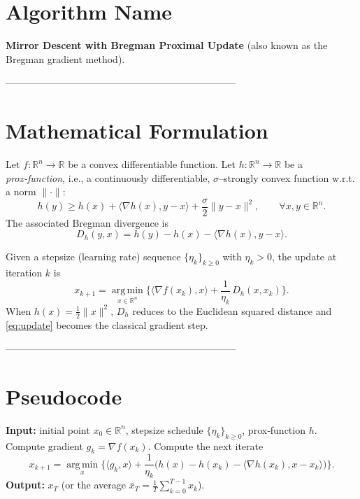 \documentclass{article}
\newcommand{\R}{\mathbb{R}}
\newcommand{\inner}[2]{\langle #1,#2\rangle}
\newcommand{\argmin}{\operatorname*{arg\,min}}
\newcommand{\D}[2]{D_{h}(#1,#2)}
\newcommand{\grad}{\nabla}
\begin{document}
\section*{Algorithm Name}
\textbf{Mirror Descent with Bregman Proximal Update} (also known as the Bregman gradient method).

-----------------------------------------------------------------------

\section*{Mathematical Formulation}
Let $f:\R^{n}\rightarrow\R$ be a convex differentiable function.  
Let $h:\R^{n}\rightarrow\R$ be a \emph{prox‑function}, i.e., a continuously differentiable, $\sigma$–strongly convex function w.r.t. a norm $\|\cdot\|$:
\[
h(y)\ge h(x)+\inner{\grad h(x)}{y-x}+\frac{\sigma}{2}\|y-x\|^{2},\qquad\forall x,y\in\R^{n}.
\]
The associated Bregman divergence is
\[
\D{y}{x}=h(y)-h(x)-\inner{\grad h(x)}{y-x}.
\]

Given a stepsize (learning rate) sequence $\{\eta_k\}_{k\ge0}$ with $\eta_k>0$, the update at iteration $k$ is
\begin{equation}
\boxed{
x_{k+1}= \argmin_{x\in\R^{n}}\Big\{\inner{\grad f(x_k)}{x}+ \frac{1}{\eta_k}\,\D{x}{x_k}\Big\}.
}
\label{eq:update}
\end{equation}
When $h(x)=\frac12\|x\|^{2}$, $D_h$ reduces to the Euclidean squared distance and \eqref{eq:update} becomes the classical gradient step.

-----------------------------------------------------------------------

\section*{Pseudocode}
\begin{algorithm}[H]
\caption{Mirror Descent with Bregman Proximal Update}
\begin{algorithmic}[1]
\State \textbf{Input:} initial point $x_0\in\R^{n}$, stepsize schedule $\{\eta_k\}_{k\ge0}$, prox‑function $h$.
    \State Compute gradient $g_k=\grad f(x_k)$.
    \State Compute the next iterate
    \[
    x_{k+1}= \argmin_{x}\Big\{\inner{g_k}{x}+ \frac{1}{\eta_k}\big( h(x)-h(x_k)-\inner{\grad h(x_k)}{x-x_k}\big)\Big\}.
    \]
\EndFor
\State \textbf{Output:} $x_T$ (or the average $\bar x_T=\frac1T\sum_{k=0}^{T-1}x_k$).
\end{algorithmic}
\end{algorithm}
\end{document}
